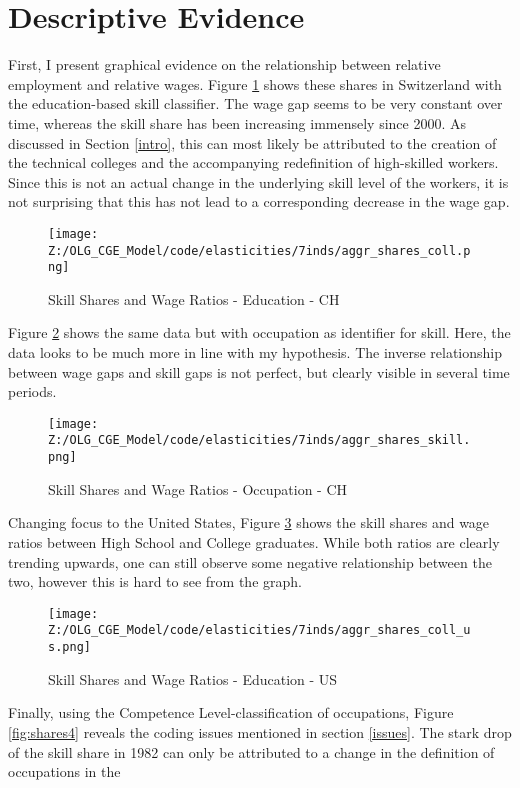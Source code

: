 \documentclass[]{article}
\begin{document}
\newpage
\section{Descriptive Evidence}
First, I present graphical evidence on the relationship between
relative employment and relative wages. Figure \ref{fig:shares1} shows
these shares in Switzerland with the education-based skill
classifier. The wage gap seems to be very constant over time, whereas
the skill share has been increasing immensely since 2000. As discussed
in Section \ref{intro}, this can most likely be attributed to the
creation of the technical colleges and the accompanying redefinition
of high-skilled workers. Since this is not an actual change in the
underlying skill level of the workers, it is not surprising that this
has not lead to a corresponding decrease in the wage gap.
\begin{figure}[H]
  \centering
  \texttt{[image: Z:/OLG\_CGE\_Model/code/elasticities/7inds/aggr\_shares\_coll.png]}
  \caption{Skill Shares and Wage Ratios - Education - CH}
  \label{fig:shares1}
\end{figure}
Figure \ref{fig:shares2} shows the same data but with occupation as
identifier for skill. Here, the data looks to be much more in line
with my hypothesis. The inverse relationship between wage gaps and
skill gaps is not perfect, but clearly visible in several time
periods.
\begin{figure}[h]
  \centering
  \texttt{[image: Z:/OLG\_CGE\_Model/code/elasticities/7inds/aggr\_shares\_skill.png]}
  \caption{Skill Shares and Wage Ratios - Occupation - CH}
  \label{fig:shares2}
\end{figure}
Changing focus to the United States, Figure \ref{fig:shares3} shows
the skill shares and wage ratios between High School and College
graduates. While both ratios are clearly trending upwards, one can
still observe some negative relationship between the two, however this
is hard to see from the graph.
\begin{figure}[h]
  \centering
  \texttt{[image: Z:/OLG\_CGE\_Model/code/elasticities/7inds/aggr\_shares\_coll\_us.png]}
  \caption{Skill Shares and Wage Ratios - Education - US}
  \label{fig:shares3}
\end{figure}
Finally, using the Competence Level-classification of occupations,
Figure \ref{fig:shares4} reveals the coding issues mentioned in
section \ref{issues}. The stark drop of the skill share in 1982 can
only be attributed to a change in the definition of occupations in the
\end{document}
